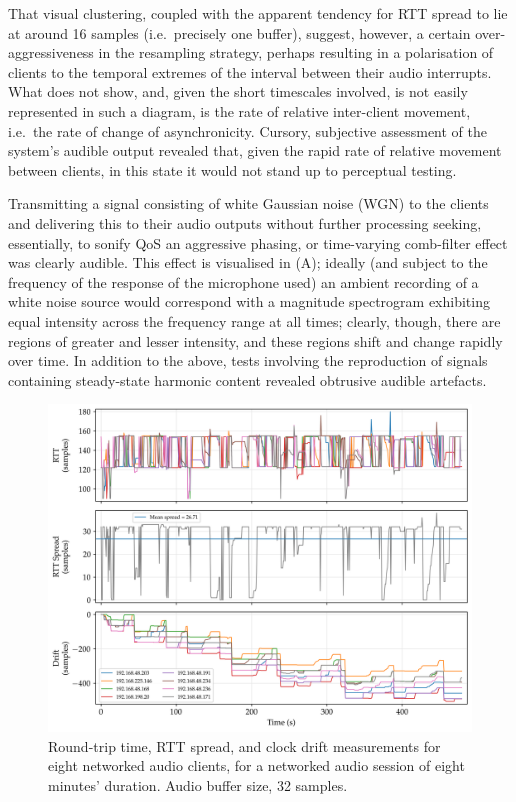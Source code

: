 That visual clustering, coupled with the apparent tendency for RTT spread to
lie at around 16 samples (i.e.\ precisely one buffer), suggest, however, a
certain over-aggressiveness in the resampling strategy, perhaps resulting in a
polarisation of clients to the temporal extremes of the interval between their
audio interrupts.
What  does not show, and, given the short timescales
involved, is not easily represented in such a diagram, is the rate of relative
inter-client movement, i.e.\ the rate of change of asynchronicity.
Cursory, subjective assessment of the system's audible output revealed that,
given the rapid rate of relative movement between clients, in this state it
would not stand up to perceptual testing.

Transmitting a signal consisting of white Gaussian noise (WGN) to the clients
and delivering this to their audio outputs without further processing
\textemdash{} seeking, essentially, to sonify QoS \textemdash{} an
aggressive phasing, or time-varying comb-filter effect was clearly audible.
This effect is visualised in (A); ideally (and
subject to the frequency of the response of the microphone used) an ambient
recording of a white noise source would correspond with a magnitude spectrogram
exhibiting equal intensity across the frequency range at all times; clearly,
though, there are regions of greater and lesser intensity, and these regions
shift and change rapidly over time.
In addition to the above, tests involving the reproduction of signals
containing steady-state harmonic content revealed obtrusive audible artefacts.

\begin{figure}[ht]
    \centering
    \includegraphics[width=\textwidth]{figures/rtt_drift_32}
    \caption{
        Round-trip time, RTT spread, and clock drift measurements
        for eight networked audio clients, for a networked audio session of
        eight minutes' duration.
        Audio buffer size, 32 samples.
    }
    \label{fig:rtt-drift-32}
\end{figure}

